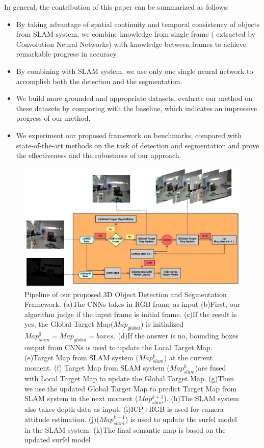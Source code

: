 \documentclass[conference]{IEEEtran}
\begin{document}
 


                                                                            

In general, the contribution of this paper can be summarized as follows:
\begin{itemize}
\item By taking advantage of spatial continuity and temporal consistency of objects from SLAM system, we combine knowledge  from single frame ( extracted by Convolution Neural Networks) with knowledge between frames to achieve remarkable progress in accuracy.
\item By combining with SLAM system, we use only one single neural network to accomplish both the detection and the segmentation.
\item We build more grounded and appropriate datasets, evaluate our method on these datasets by comparing with the baseline, which indicates an impressive progress of our method.    
\item We experiment our proposed framework on  benchmarks, compared with state-of-the-art methods on the task of detection and segmentation and prove the effectiveness and the robustness of our approach. 
\end{itemize}

\begin{figure}[h]
	\centering
	\includegraphics[width=1.0\textwidth]{pic/pipeline.eps}
	\centering
	\caption{{\color{blue}Pipeline of our proposed 3D Object Detection and Segmentation Framework.} (a)The CNNs takes in RGB frame as input (b)First, our algorithm judge if the input frame is initial frame. (c)If the result is yes,  the Global Target Map($Map_{global}$) is initialized{$Map^{0}_{slam}=Map_{global}=boxes$}. (d)If the answer is no,  bounding boxes output from CNNs is used to update the Local Target Map. (e)Target Map from SLAM system ($Map^{k}_{slam}$) at the current moment. (f) Target Map from SLAM system ($Map^{k}_{slam}$)are fused with Local Target Map to update the Global Target Map. (g)Then we use the updated Global Target Map to predict Target Map from SLAM system in the next moment ($Map^{k+1}_{slam}$). (h)The SLAM system also takes depth data as input. (i)ICP+RGB is used for camera attitude estimation. (j)($Map^{k+1}_{slam}$) is used to update the surfel model in the SLAM system. (k)The final semantic map is based on the updated surfel model }
	\label{fig:fig_flowchart}
\end{figure}
\end{document}
